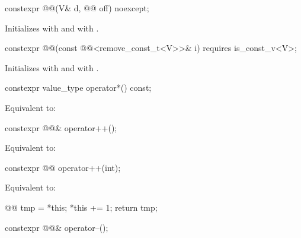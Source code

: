 \begin{itemdecl}
constexpr @@(V& d, @@ off) noexcept;
\end{itemdecl}

\begin{itemdescr}
\pnum
\effects
Initializes  with  and  with .
\end{itemdescr}

\begin{itemdecl}
constexpr @@(const @@<remove_const_t<V>>& i) requires is_const_v<V>;
\end{itemdecl}

\begin{itemdescr}
\pnum
\effects
Initializes  with  and  with .
\end{itemdescr}

\begin{itemdecl}
constexpr value_type operator*() const;
\end{itemdecl}

\begin{itemdescr}
\pnum
\effects
Equivalent to: 
\end{itemdescr}

\begin{itemdecl}
constexpr @@& operator++();
\end{itemdecl}

\begin{itemdescr}
\pnum
\effects
Equivalent to: 
\end{itemdescr}

\begin{itemdecl}
constexpr @@ operator++(int);
\end{itemdecl}

\begin{itemdescr}
\pnum
\effects
Equivalent to:
\begin{codeblock}
@@ tmp = *this;
*this += 1;
return tmp;
\end{codeblock}
\end{itemdescr}

\begin{itemdecl}
constexpr @@& operator--();
\end{itemdecl}

